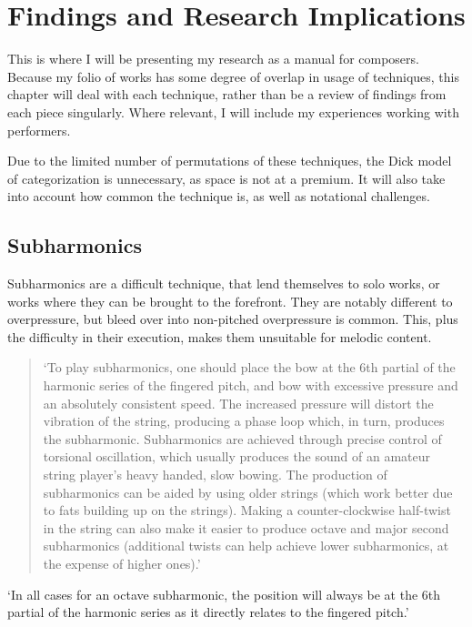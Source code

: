 
\chapter{Findings and Research Implications}
This is where I will be presenting my research as a manual for composers.
Because my folio of works has some degree of overlap in usage of techniques, this chapter will deal with each technique, rather than be a review of findings from each piece singularly.
Where relevant, I will include my experiences working with performers.

Due to the limited number of permutations of these techniques, the Dick model of categorization is unnecessary, as space is not at a premium.\autocite{dickOtherFlute1989} 
It will also take into account how common the technique is, as well as notational challenges.

\section{Subharmonics} \label{sec:subharmonics}
Subharmonics are a difficult technique, that lend themselves to solo works, or works where they can be brought to the forefront.
They are notably different to overpressure, but bleed over into non-pitched overpressure is common.
This, plus the difficulty in their execution, makes them unsuitable for melodic content.

\begin{quotation}
  `To play subharmonics, one should place the bow at the 6th partial of the harmonic series of the fingered pitch, and bow with excessive pressure and an absolutely consistent speed. 
  The increased pressure will distort the vibration of the string, producing a phase loop which, in turn, produces the subharmonic. 
  Subharmonics are achieved through precise control of torsional oscillation, which usually produces the sound of an amateur string player's heavy handed, slow bowing. 
  The production of subharmonics can be aided by using older strings (which work better due to fats building up on the strings). 
  Making a counter-clockwise half-twist in the string can also make it easier to produce octave and major second subharmonics (additional twists can help achieve lower subharmonics, at the expense of higher ones).'
\end{quotation}

`In all cases for an octave subharmonic, the position will always be at the 6th partial of the harmonic series as it directly relates to the fingered pitch.'\autocite[]{longModernDoubleBass}

